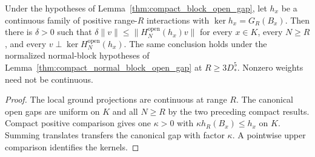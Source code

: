 \begin{lemma}
    \label{thm:compact_block_open_positive_gap}
    \leanok
    Under the hypotheses of Lemma~\ref{thm:compact_block_open_gap},
    let $h_x$ be a continuous family of positive range-$R$ interactions
    with $\ker h_x=G_R(B_x)$. Then there is $\delta>0$ such that
    $\delta\|v\|\leq\|H^{\mathrm{open}}_N(h_x)v\|$ for every $x\in K$,
    every $N\geq R$, and every $v\perp\ker H^{\mathrm{open}}_N(h_x)$.
    The same conclusion holds under the normalized normal-block hypotheses
    of Lemma~\ref{thm:compact_normal_block_open_gap} at $R\geq3D_*^5$.
    Nonzero weights need not be continuous.
\end{lemma}
\begin{proof}\leanok
    The local ground projections are continuous at range $R$.
    The canonical open gaps are uniform on $K$ and all $N\geq R$ by
    the two preceding compact results. Compact positive comparison gives
    one $\kappa>0$ with $\kappa h_R(B_x)\leq h_x$ on $K$.
    Summing translates transfers the canonical gap with factor $\kappa$.
    A pointwise upper comparison identifies the kernels.
\end{proof}

